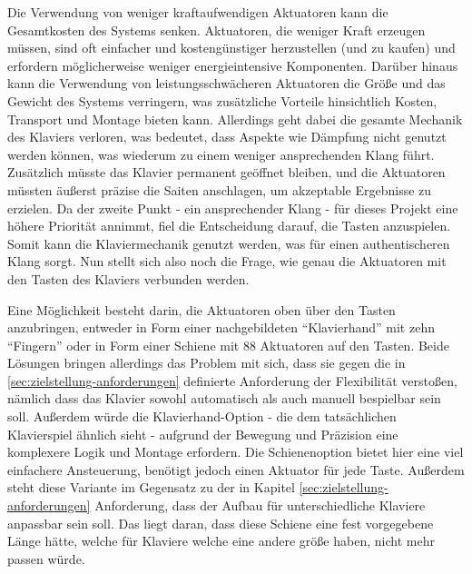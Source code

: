 Die Verwendung von weniger kraftaufwendigen Aktuatoren kann die Gesamtkosten des Systems senken. Aktuatoren, die weniger
Kraft erzeugen müssen, sind oft einfacher und kostengünstiger herzustellen (und zu kaufen) und erfordern möglicherweise weniger
energieintensive Komponenten. Darüber hinaus kann die Verwendung von leistungsschwächeren
Aktuatoren die Größe und das Gewicht des Systems verringern, was zusätzliche Vorteile hinsichtlich Kosten, Transport und
Montage bieten kann. \newline
Allerdings geht dabei die gesamte Mechanik des Klaviers verloren, was bedeutet, dass Aspekte wie Dämpfung nicht genutzt werden können,
was wiederum zu einem weniger ansprechenden Klang führt. Zusätzlich müsste das Klavier permanent geöffnet bleiben, und die
Aktuatoren müssten äußerst präzise die Saiten anschlagen, um akzeptable Ergebnisse zu erzielen.
Da der zweite Punkt - ein ansprechender Klang - für dieses Projekt eine höhere Priorität annimmt, fiel die Entscheidung
darauf, die Tasten anzuspielen. Somit kann die Klaviermechanik genutzt werden, was für einen
authentischeren Klang sorgt. \newline
Nun stellt sich also noch die Frage, wie genau die Aktuatoren mit den Tasten des Klaviers verbunden werden.

Eine Möglichkeit besteht darin, die Aktuatoren oben über den Tasten anzubringen, entweder in Form einer nachgebildeten
\enquote{Klavierhand} mit zehn \enquote{Fingern} oder in Form einer Schiene mit 88 Aktuatoren auf den Tasten.
Beide Lösungen bringen allerdings das Problem mit sich, dass sie gegen die in \ref{sec:zielstellung-anforderungen} definierte Anforderung
der Flexibilität verstoßen, nämlich dass das Klavier sowohl automatisch als auch manuell bespielbar sein soll.\newline
Außerdem würde die Klavierhand-Option - die dem tatsächlichen Klavierspiel ähnlich sieht -
aufgrund der Bewegung und Präzision eine komplexere Logik und
Montage erfordern. Die Schienenoption bietet hier eine viel einfachere Ansteuerung, benötigt jedoch einen Aktuator für jede Taste.
Außerdem steht diese Variante im Gegensatz zu der in Kapitel \ref{sec:zielstellung-anforderungen} Anforderung, dass der Aufbau für unterschiedliche Klaviere anpassbar
sein soll. Das liegt daran, dass diese Schiene eine fest vorgegebene Länge hätte, welche für Klaviere welche eine
andere größe haben, nicht mehr passen würde. \newline

